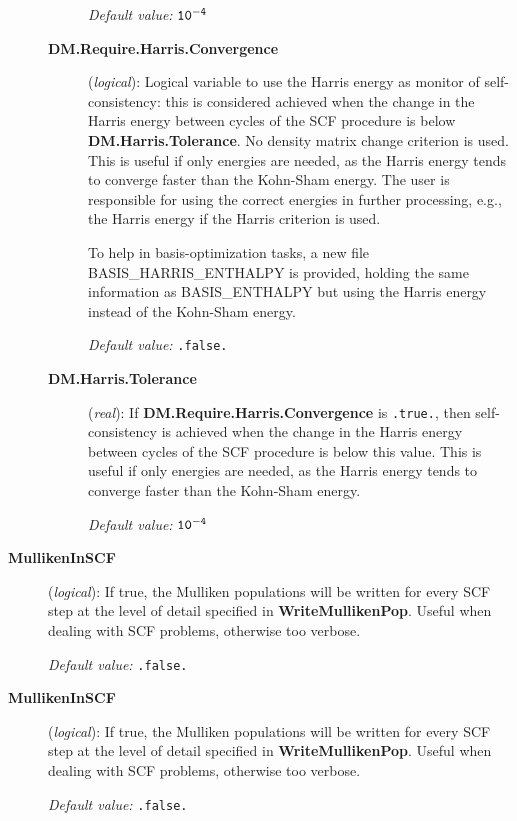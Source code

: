 \documentclass[11pt]{article}
\begin{document}
\begin{description}
\begin{description}
{\it Default value:} {${\tt 10^{-4}}$}

\item[{\bf DM.Require.Harris.Convergence}] ({\it logical}):
Logical variable to use the Harris energy as monitor of
self-consistency: this is considered achieved when the change in the Harris energy between cycles
of the SCF procedure is below {\bf DM.Harris.Tolerance}. No density
matrix change criterion is used.
This is useful if only energies are needed, as the Harris energy tends
to converge faster than the Kohn-Sham energy.
The user is responsible for using the correct energies in further
processing, e.g., the Harris energy if the Harris criterion is used.

To help in basis-optimization tasks, a new file BASIS\_HARRIS\_ENTHALPY
is provided, holding the same information as BASIS\_ENTHALPY but using
the Harris energy instead of the Kohn-Sham energy. 

{\it Default value:} {\tt .false.}


\item[{\bf DM.Harris.Tolerance}] ({\it real}): 
If {\bf DM.Require.Harris.Convergence} is {\tt .true.}, then
self-consistency is achieved when the change in the Harris energy between cycles
of the SCF procedure is below this value.
This is useful if only energies are needed, as the Harris energy tends
to converge faster than the Kohn-Sham energy.

{\it Default value:} {${\tt 10^{-4}}$}

\end{description}

\item[{\bf MullikenInSCF}] ({\it logical}):
If true, the Mulliken populations will be written for every SCF step
at the level of detail specified in {\bf WriteMullikenPop}. Useful
when dealing with SCF problems, otherwise too verbose.

{\it Default value:} {\tt .false.}

\item[{\bf MullikenInSCF}] ({\it logical}):
If true, the Mulliken populations will be written for every SCF step
at the level of detail specified in {\bf WriteMullikenPop}. Useful
when dealing with SCF problems, otherwise too verbose.

{\it Default value:} {\tt .false.}



\end{description}
\end{document}
